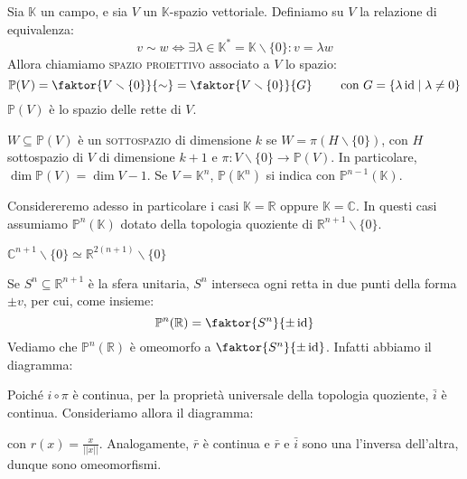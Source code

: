 \begin{defn}
Sia $\mathbb{K}$ un campo, e sia $V$ un $\mathbb{K}$-spazio vettoriale. Definiamo su $V$ la relazione di equivalenza:
$$v \sim w \Longleftrightarrow \exists \lambda \in \mathbb{K}^*=\mathbb{K}\smallsetminus \{0\} : v=\lambda w$$
Allora chiamiamo \textsc{spazio proiettivo} associato a $V$ lo spazio:
$$\mathbb{P}(V)=\faktor {V \smallsetminus \{0\}}{\sim}=\faktor{V \smallsetminus \{0\}}{G} \qquad \text{ con }G=\{\lambda \id \mid \lambda \neq 0\}$$
$\mathbb{P}(V)$ è lo spazio delle rette di $V$.
\end{defn}

\begin{defn}
$W \subseteq \mathbb{P}(V)$ è un \textsc{sottospazio} di dimensione $k$ se $W=\pi (H\smallsetminus \{0\})$, con $H$ sottospazio di $V$ di dimensione $k+1$ e $\pi :V\smallsetminus \{0\} \longrightarrow \mathbb{P}(V)$. In particolare, $\dim \mathbb{P}(V)=\dim V -1$. Se $V=\mathbb{K}^n$, $\mathbb{P}(\mathbb{K}^n)$ si indica con $\mathbb{P}^{n-1}(\mathbb{K})$.
\end{defn}

Considereremo adesso in particolare i casi $\mathbb{K}=\mathbb{R}$ oppure $\mathbb{K}=\mathbb{C}$. In questi casi assumiamo $\mathbb{P}^n(\mathbb{K})$ dotato della topologia quoziente di $\mathbb{R}^{n+1}\smallsetminus \{0\}$.

\begin{oss}
$\mathbb{C}^{n+1} \smallsetminus \{0\} \simeq \mathbb{R}^{2(n+1)} \smallsetminus \{0\}$
\end{oss}

\begin{oss}
Se $S^n \subseteq \mathbb{R}^{n+1}$ è la sfera unitaria, $S^n$ interseca ogni retta in due punti della forma $\pm v$, per cui, come insieme:
$$\mathbb{P}^n(\mathbb{R})=\faktor{S^n}{\pm \id}$$
Vediamo che $\mathbb{P}^n(\mathbb{R})$ è omeomorfo a $\faktor{S^n}{\pm \id}$. Infatti abbiamo il diagramma:
\begin{center}
\end{center}
Poiché $i \circ \pi$ è continua, per la proprietà universale della topologia quoziente, $\bar{i}$ è continua. Consideriamo allora il diagramma:
\begin{center}
\end{center}
con $r(x)=\frac{x}{||x||}$. Analogamente, $\bar{r}$ è continua e $\bar{r}$ e $\bar{i}$ sono una l'inversa dell'altra, dunque sono omeomorfismi.
\end{oss}

